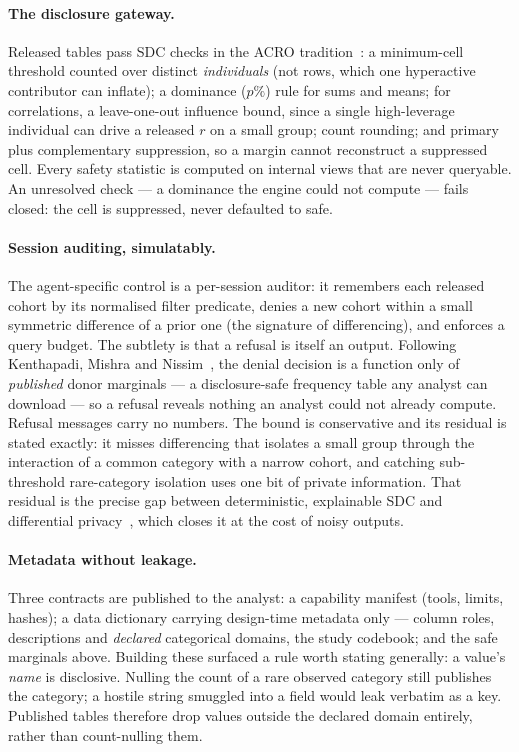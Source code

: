 \documentclass[11pt,a4paper]{article}
\begin{document}
\paragraph{The disclosure gateway.}
Released tables pass SDC checks in the ACRO
tradition~\cite{acro}: a minimum-cell threshold counted over distinct
\emph{individuals} (not rows, which one hyperactive contributor can inflate); a
dominance ($p\%$) rule for sums and means; for correlations, a leave-one-out
influence bound, since a single high-leverage individual can drive a released
$r$ on a small group; count rounding; and primary plus complementary
suppression, so a margin cannot reconstruct a suppressed cell. Every safety
statistic is computed on internal views that are never queryable. An
unresolved check --- a dominance the engine could not compute --- fails
closed: the cell is suppressed, never defaulted to safe.

\paragraph{Session auditing, simulatably.}
\label{sec:auditor}
The agent-specific control is a per-session auditor: it remembers each
released cohort by its normalised filter predicate, denies a new cohort within
a small symmetric difference of a prior one (the signature of differencing),
and enforces a query budget. The subtlety is that a refusal is itself an
output. Following Kenthapadi, Mishra and Nissim~\cite{kenthapadi2005}, the
denial decision is a function only of \emph{published} donor marginals --- a
disclosure-safe frequency table any analyst can download --- so a refusal
reveals nothing an analyst could not already compute. Refusal messages carry
no numbers. The bound is conservative and its residual is stated exactly: it
misses differencing that isolates a small group through the interaction of a
common category with a narrow cohort, and catching sub-threshold
rare-category isolation uses one bit of private information. That residual is
the precise gap between deterministic, explainable SDC and differential
privacy~\cite{dwork2006}, which closes it at the cost of noisy outputs.

\paragraph{Metadata without leakage.}
Three contracts are published to the analyst: a capability manifest (tools,
limits, hashes); a data dictionary carrying design-time metadata only ---
column roles, descriptions and \emph{declared} categorical domains, the study
codebook; and the safe marginals above. Building these surfaced a rule worth
stating generally: a value's \emph{name} is disclosive. Nulling the count of a
rare observed category still publishes the category; a hostile string smuggled
into a field would leak verbatim as a key. Published tables therefore drop
values outside the declared domain entirely, rather than count-nulling them.
\end{document}
